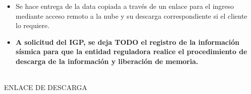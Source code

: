 \begin{longtblr}
\begin{itemize}
    	\item Se hace entrega de la data copiada a través de un enlace para el ingreso mediante acceso remoto a la nube y su descarga correspondiente si el cliente lo requiere.
    	\item {\bfseries\color{SuAzul} A solicitud del IGP, se deja TODO el registro de la información sísmica para que la entidad reguladora realice el procedimiento de descarga de la información y liberación de memoria.}
    \end{itemize} \\
     ENLACE DE DESCARGA \\
     \Enlace
\end{longtblr}
